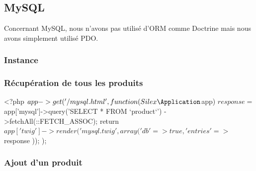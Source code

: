 \documentclass[11pt,a4paper]{report}
\begin{document}
            \subsection{MySQL}
                
                Concernant MySQL, nous n'avons pas utilisé d'ORM comme Doctrine mais nous avons simplement utilisé PDO.
                
                \subsubsection{Instance}
                    
                    
                \subsubsection{Récupération de tous les produits}
                    
                    \begin{phpcode}
                        <?php
                        $app->get('/mysql.html', function(Silex\Application $app) {
                            $response = $app['mysql']->query('SELECT * FROM `product`')
                                        ->fetchAll(\PDO::FETCH_ASSOC);
                            return $app['twig']->render('mysql.twig', array(
                                'db'        => true,
                                'entries'   => $response
                            ));
                        });
                    \end{phpcode}
                    
                \subsubsection{Ajout d'un produit}
                    
\end{document}
